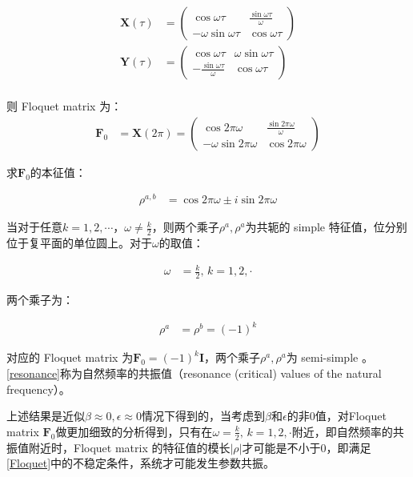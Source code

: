 \begin{align}
    \mathbf{X}(\tau) &= 
    \begin{pmatrix}
        \cos\omega \tau & \frac{\sin\omega \tau}{\omega} \\ 
        -\omega\sin\omega \tau & \cos\omega \tau
    \end{pmatrix} \\
    \mathbf{Y}(\tau) &= 
    \begin{pmatrix}
        \cos\omega \tau & \omega\sin\omega \tau \\ 
        -\frac{\sin\omega \tau}{\omega} & \cos\omega \tau
    \end{pmatrix} \\
\end{align}

则 Floquet matrix 为：
\begin{align}
    \mathbf{F}_{0} &= \mathbf{X}(2\pi) =
    \begin{pmatrix}
        \cos2\pi\omega & \frac{\sin2\pi\omega}{\omega} \\ 
        -\omega\sin2\pi\omega & \cos2\pi\omega
    \end{pmatrix}
\end{align}

求$\mathbf{F}_{0}$的本征值：

\begin{align}
    \rho^{a,b} &= \cos2\pi\omega\pm i\sin2\pi\omega
\end{align}

当对于任意$k=1,2,\cdots$，$\omega\neq\frac{k}{2}$，则两个乘子$\rho^{a},\rho^{a}$为共轭的 simple 特征值，位分别位于复平面的单位圆上。对于$\omega$的取值：

\begin{align}
    \omega &= \frac{k}{2},\,k=1,2,\cdot \label{resonance}
\end{align}

两个乘子为：

\begin{align}
    \rho^{a} &= \rho^{b} = (-1)^{k}
\end{align}

对应的 Floquet matrix 为$\mathbf{F}_{0}=(-1)^{k}\mathbf{I}$，两个乘子$\rho^{a},\rho^{a}$为 semi-simple 。\eqref{resonance}称为自然频率的共振值（resonance (critical) values of the natural frequency）。

上述结果是近似$\beta\approx0,\epsilon\approx0$情况下得到的，当考虑到$\beta$和$\epsilon$的非0值，对Floquet matrix $\mathbf{F}_{0}$做更加细致的分析得到\cite{seyranian_multiparameter_nodate}，只有在$\omega=\frac{k}{2},\,k=1,2,\cdot$附近，即自然频率的共振值附近时，Floquet matrix 的特征值的模长$|\rho|$才可能是不小于0，即满足\eqref{Floquet}中的不稳定条件，系统才可能发生参数共振。


